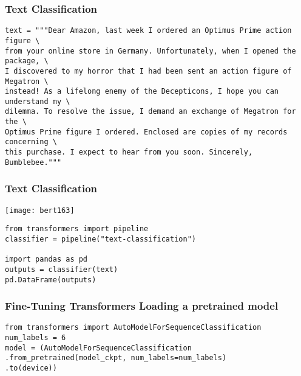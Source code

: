 \begin{frame}[fragile]\frametitle{Text Classification}

\begin{lstlisting}
text = """Dear Amazon, last week I ordered an Optimus Prime action figure \
from your online store in Germany. Unfortunately, when I opened the package, \
I discovered to my horror that I had been sent an action figure of Megatron \
instead! As a lifelong enemy of the Decepticons, I hope you can understand my \
dilemma. To resolve the issue, I demand an exchange of Megatron for the \
Optimus Prime figure I ordered. Enclosed are copies of my records concerning \
this purchase. I expect to hear from you soon. Sincerely, Bumblebee."""
\end{lstlisting}
			
\end{frame}

\begin{frame}[fragile]\frametitle{Text Classification}

			\begin{center}
			\texttt{[image: bert163]}
			\end{center}	
			
			
\begin{lstlisting}
from transformers import pipeline
classifier = pipeline("text-classification")

import pandas as pd
outputs = classifier(text)
pd.DataFrame(outputs) 
\end{lstlisting}
			
			

			
\end{frame}

\begin{frame}[fragile]\frametitle{Fine-Tuning Transformers Loading a pretrained model}

\begin{lstlisting}
from transformers import AutoModelForSequenceClassification
num_labels = 6
model = (AutoModelForSequenceClassification
.from_pretrained(model_ckpt, num_labels=num_labels)
.to(device))
\end{lstlisting}
			
			
\end{frame}

